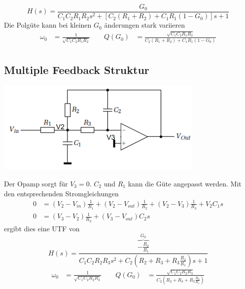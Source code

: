 \[
H(s) = \frac{G_0}{C_1C_2R_1R_2s^2 + [C_2(R_1 + R_2) + C_1R_1(1 - G_0)]s + 1}
\]
Die Polgüte kann bei kleinen $G_0$ änderungen stark variieren
\begin{align*}
	\omega_0 &= \frac{1}{\sqrt{C_1C_2R_1R_2}} \qquad Q(G_0) &= \frac{\sqrt{C_1C_2R_1R_2}}{C_2(R_1 + R_2) + C_1R_1(1 - G_0) } \\
\end{align*}


\subsection{Multiple Feedback Struktur}
\begin{center}
	\includegraphics[width=0.7\columnwidth]{Images/multi_feedback}
\end{center}
Der Opamp sorgt für $V_3 = 0$. $C_2$ und $R_1$ kann die Güte angepasst werden. Mit den entsprechenden Stromgleichungen 
\begin{align*}
	0 &= (V_2 - V_{in})\frac{1}{R_1}+(V_2 - V_{out})\frac{1}{R_2} + (V_2 - V_3)\frac{1}{R_3} + V_2C_1s \\
	0 &= (V_3 - V_2)\frac{1}{R_3} + (V_3 - V_{out})C_2s
\end{align*}
ergibt dies eine UTF von
\[
H(s) = \frac{\overbrace{-\frac{R_2}{R_1}}^{G_0}}{C_1C_2R_2R_3s^2 + C_2\left(R_2 + R_3 + R_3\frac{R_2}{R_1}\right)s + 1}
\]
\begin{align*}
	\omega_0 &= \frac{1}{\sqrt{C_1C_2R_2R_3}} \qquad 
	Q(G_0) &= \frac{\sqrt{C_1C_2R_2R_3}}{C_2\left(R_2 + R_3 + R_3\frac{R_2}{R_1}\right) } \\
\end{align*}



